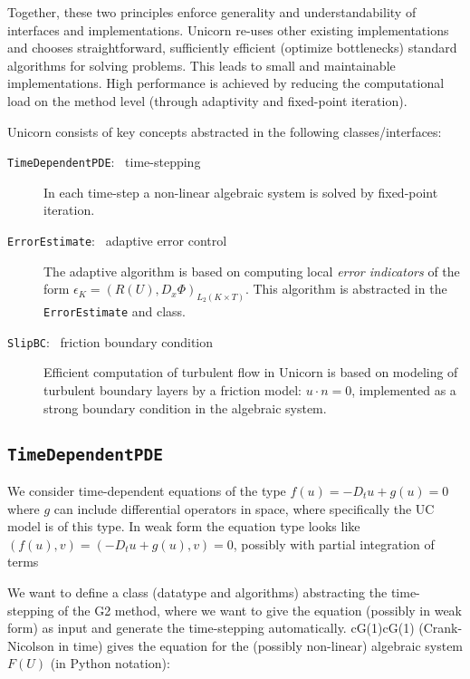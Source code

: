 Together, these two principles enforce generality and
understandability of interfaces and implementations. Unicorn re-uses
other existing implementations and chooses straightforward,
sufficiently efficient (optimize bottlenecks) standard algorithms for
solving problems. This leads to small and maintainable
implementations. High performance is achieved by reducing the
computational load on the method level (through adaptivity and
fixed-point iteration).

Unicorn consists of key concepts abstracted in the following
classes/interfaces:

\begin{description}
\item[{\tt TimeDependentPDE}: \ time-stepping]
In each time-step a non-linear algebraic system is solved by
fixed-point iteration.
\item[{\tt ErrorEstimate}: \ adaptive error control]
The adaptive algorithm is based on computing local {\em error
indicators} of the form $\epsilon_K = (R(U), D_x \Phi)_{L_2(K \times T)}$. This
algorithm is abstracted in the {\tt ErrorEstimate} and class.
\item[{\tt SlipBC}: \ friction boundary condition]
Efficient computation of turbulent flow in Unicorn is based on
modeling of turbulent boundary layers by a friction model: $u \cdot n
= 0$, implemented as a strong boundary condition in the algebraic
system.
\end{description}

\subsection{\tt TimeDependentPDE}

We consider time-dependent equations of the type $f(u) = -D_t u + g(u)
= 0$ where $g$ can include differential operators in space, where
specifically the UC model is of this type. In weak form the equation
type looks like$(f(u), v) = (-D_t u + g(u), v) = 0$, possibly with
partial integration of terms

We want to define a class (datatype and algorithms) abstracting the
time-stepping of the G2 method, where we want to give the equation
(possibly in weak form) as input and generate the time-stepping
automatically. cG(1)cG(1) (Crank-Nicolson in time) gives the equation
for the (possibly non-linear) algebraic system $F(U)$ (in Python
notation):


